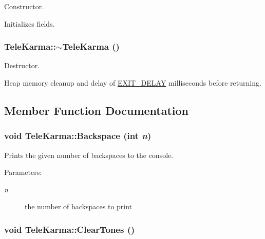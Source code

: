 Constructor. 

Initializes fields. \hypertarget{classTeleKarma_5486e84d7320be3da1139e9d48d02401}{
\subsubsection[{$\sim$TeleKarma}]{\setlength{\rightskip}{0pt plus 5cm}TeleKarma::$\sim$TeleKarma ()}}
\label{classTeleKarma_5486e84d7320be3da1139e9d48d02401}


Destructor. 

Heap memory cleanup and delay of \hyperlink{}{EXIT\_\-DELAY} milliseconds before returning. 

\subsection{Member Function Documentation}
\hypertarget{classTeleKarma_8f93d5531f5914eb77d7f0fe341e20cf}{
\subsubsection[{Backspace}]{\setlength{\rightskip}{0pt plus 5cm}void TeleKarma::Backspace (int {\em n})}}
\label{classTeleKarma_8f93d5531f5914eb77d7f0fe341e20cf}


Prints the given number of backspaces to the console. 

\begin{Desc}
\item[Parameters:]
\begin{description}
\item[{\em n}]the number of backspaces to print \end{description}
\end{Desc}
\hypertarget{classTeleKarma_5d1ced337173e7260efdb3f13fe54bf9}{
\subsubsection[{ClearTones}]{\setlength{\rightskip}{0pt plus 5cm}void TeleKarma::ClearTones ()}}
\label{classTeleKarma_5d1ced337173e7260efdb3f13fe54bf9}


